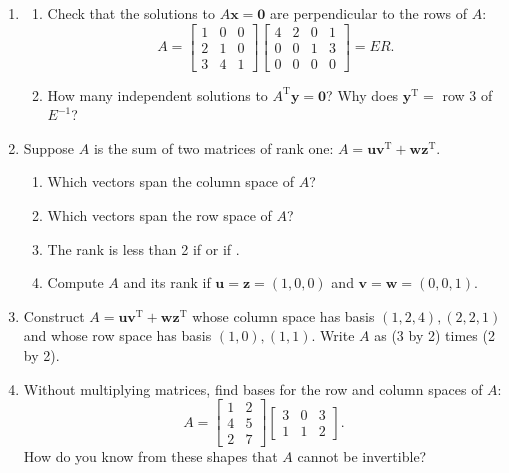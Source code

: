 \documentclass[14pt, a4paper]{article}
\begin{document}
\begin{enumerate}
    \item
          \begin{enumerate}
              \item Check that the solutions to $A\boldsymbol{x} = \boldsymbol{0}$ are perpendicular to the rows of $A$:
                    \[
                        A = \begin{bmatrix} 1 & 0 & 0 \\ 2 & 1 & 0 \\ 3 & 4 & 1 \end{bmatrix}
                        \begin{bmatrix} 4 & 2 & 0 & 1 \\ 0 & 0 & 1 & 3 \\ 0 & 0 & 0 & 0 \end{bmatrix} = ER.
                    \]
              \item How many independent solutions to $A^{\mathrm{T}}\boldsymbol{y} = \boldsymbol{0}$? Why does $\boldsymbol{y}^{\mathrm{T}} =$ row 3 of $E^{-1}$?
          \end{enumerate}

    \item Suppose $A$ is the sum of two matrices of rank one: $A = \boldsymbol{u}\boldsymbol{v}^{\mathrm{T}} + \boldsymbol{w}\boldsymbol{z}^{\mathrm{T}}$.
          \begin{enumerate}
              \item Which vectors span the column space of $A$?
              \item Which vectors span the row space of $A$?
              \item The rank is less than 2 if \underline{\hspace{1.5cm}} or if \underline{\hspace{1.5cm}}.
              \item Compute $A$ and its rank if $\boldsymbol{u} = \boldsymbol{z} = (1, 0, 0)$ and $\boldsymbol{v} = \boldsymbol{w} = (0, 0, 1)$.
          \end{enumerate}

    \item Construct $A = \boldsymbol{u}\boldsymbol{v}^{\mathrm{T}} + \boldsymbol{w}\boldsymbol{z}^{\mathrm{T}}$ whose column space has basis $(1, 2, 4), (2, 2, 1)$ and whose row space has basis $(1, 0), (1, 1)$. Write $A$ as (3 by 2) times (2 by 2).

    \item Without multiplying matrices, find bases for the row and column spaces of $A$:
          \[
              A = \begin{bmatrix} 1 & 2 \\ 4 & 5 \\ 2 & 7 \end{bmatrix} \begin{bmatrix} 3 & 0 & 3 \\ 1 & 1 & 2 \end{bmatrix}.
          \]
          How do you know from these shapes that $A$ cannot be invertible?


\end{enumerate}
\end{document}
